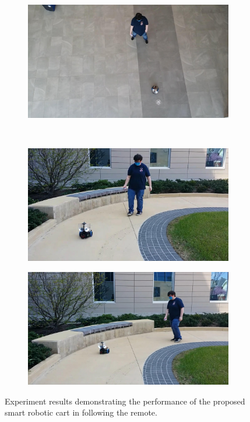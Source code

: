 \documentclass[conference]{IEEEtran}
\begin{document}
\begin{figure}[htbp]
\begin{subfigure}[b]{0.30\linewidth}
    \caption{}
    \label{fig:491}
  \end{subfigure}
  \begin{subfigure}[b]{0.30\linewidth}
    \centering
    \includegraphics[width=\textwidth]{videos/frames/561.jpeg} 
    \caption{}
    \label{fig:561}
  \end{subfigure}
  \\
  \begin{subfigure}[b]{0.30\linewidth}
    \centering
    \includegraphics[width=\textwidth]{videos/frames/631.jpeg} 
    \caption{}
    \label{fig:631}
  \end{subfigure}
  \begin{subfigure}[b]{0.30\linewidth}
    \centering
    \includegraphics[width=\textwidth]{videos/frames/701.jpeg} 
    \caption{}
    \label{fig:701}
  \end{subfigure}
  \caption{Experiment results demonstrating the performance of the proposed smart robotic cart in following the remote.}
  \label{fig:experResultsImages}
\end{figure}
\end{document}
